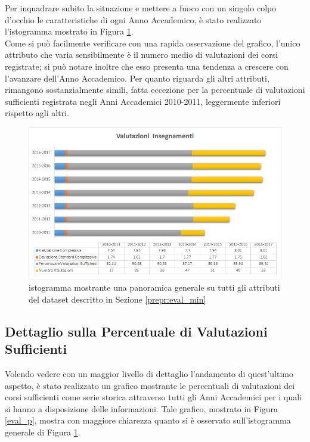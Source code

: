     Per inquadrare subito la situazione e mettere a fuoco con un singolo colpo d'occhio le caratteristiche di ogni Anno Accademico, è stato realizzato l'istogramma mostrato in Figura \ref{eval_gen}. \\

    Come si può facilmente verificare con una rapida osservazione del grafico, l'unico attributo che varia sensibilmente è il numero medio di valutazioni dei corsi registrate; si può notare inoltre che esso presenta una tendenza a crescere con l'avanzare dell'Anno Accademico. Per quanto riguarda gli altri attributi, rimangono sostanzialmente simili, fatta eccezione per la percentuale di valutazioni sufficienti registrata negli Anni Accademici 2010-2011, leggermente inferiori rispetto agli altri. \\

    \begin{figure}
        \centering
        \caption{istogramma mostrante una panoramica generale su tutti gli attributi del dataset descritto in Sezione \ref{prepr:eval_min}}
        \label{eval_gen}
        \includegraphics[scale=0.55]{../visual/eval_3.png}
    \end{figure}

    \subsection{Dettaglio sulla Percentuale di Valutazioni Sufficienti}

    Volendo vedere con un maggior livello di dettaglio l'andamento di quest'ultimo aspetto, è stato realizzato un grafico mostrante le percentuali di valutazioni dei corsi sufficienti come serie storica attraverso tutti gli Anni Accademici per i quali si hanno a disposizione delle informazioni. Tale grafico, mostrato in Figura \ref{eval_p}, mostra con maggiore chiarezza quanto si è osservato sull'istogramma generale di Figura \ref{eval_gen}. \\

